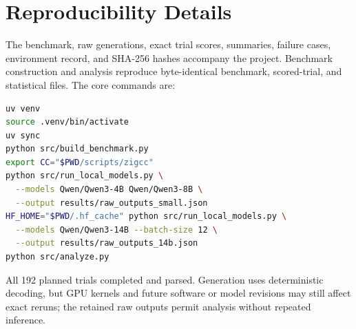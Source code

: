 \section{Reproducibility Details}
\label{sec:reproducibility}

The benchmark, raw generations, exact trial scores, summaries, failure cases, environment record, and SHA-256 hashes accompany the project. Benchmark construction and analysis reproduce byte-identical benchmark, scored-trial, and statistical files. The core commands are:

\begin{lstlisting}[language=bash,basicstyle=\ttfamily\tiny,frame=none,xleftmargin=0pt,xrightmargin=0pt,breaklines=true,mathescape=false]
uv venv
source .venv/bin/activate
uv sync
python src/build_benchmark.py
export CC="$PWD/scripts/zigcc"
python src/run_local_models.py \
  --models Qwen/Qwen3-4B Qwen/Qwen3-8B \
  --output results/raw_outputs_small.json
HF_HOME="$PWD/.hf_cache" python src/run_local_models.py \
  --models Qwen/Qwen3-14B --batch-size 12 \
  --output results/raw_outputs_14b.json
python src/analyze.py
\end{lstlisting}

All 192 planned trials completed and parsed. Generation uses deterministic decoding, but GPU kernels and future software or model revisions may still affect exact reruns; the retained raw outputs permit analysis without repeated inference.
